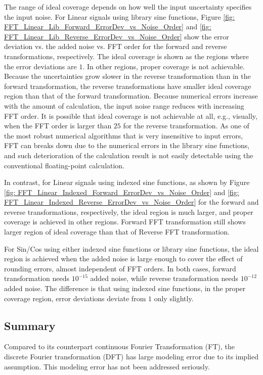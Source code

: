 \documentclass[twoside]{article}
\numberwithin{equation}{section}
\begin{document}
The range of ideal coverage depends on how well the input uncertainty specifies the input noise.  
For Linear signals using library sine functions, Figure \ref{fig: FFT_Linear_Lib_Forward_ErrorDev_vs_Noise_Order} and \ref{fig: FFT_Linear_Lib_Reverse_ErrorDev_vs_Noise_Order} show the error deviation vs. the added noise vs. FFT order for the forward and reverse transformations, respectively.
The ideal coverage is shown as the regions where the error deviations are $1$.
In other regions, proper coverage is not achievable.
Because the uncertainties grow slower in the reverse transformation than in the forward transformation, the reverse transformations have smaller ideal coverage region than that of the forward transformation.
Because numerical errors increase with the amount of calculation, the input noise range reduces with increasing FFT order.
It is possible that ideal coverage is not achievable at all, e.g., visually, when the FFT order is larger than $25$ for the reverse transformation.
As one of the most robust numerical algorithms that is very insensitive to input errors, FFT can breaks down due to the numerical errors in the library sine functions, and such deterioration of the calculation result is not easily detectable using the conventional floating-point calculation.

In contrast, for Linear signals using indexed sine functions, as shown by Figure \ref{fig: FFT_Linear_Indexed_Forward_ErrorDev_vs_Noise_Order} and \ref{fig: FFT_Linear_Indexed_Reverse_ErrorDev_vs_Noise_Order} for the forward and reverse transformations, respectively, the ideal region is much larger, and proper coverage is achieved in other regions.
Forward FFT transformation still shows larger region of ideal coverage than that of Reverse FFT transformation.

For Sin/Cos using either indexed sine functions or library sine functions, the ideal region is achieved when the added noise is large enough to cover the effect of rounding errors, almost independent of FFT orders. 
In both cases, forward transformation needs $10^{-15}$ added noise, while reverse transformation needs $10^{-12}$ added noise.
The difference is that using indexed sine functions, in the proper coverage region, error deviations deviate from $1$ only slightly.


\subsection{Summary}

Compared to its counterpart continuous Fourier Transformation (FT), the discrete Fourier transformation (DFT) has large modeling error due to its implied assumption.
This modeling error has not been addressed seriously.
\end{document}
